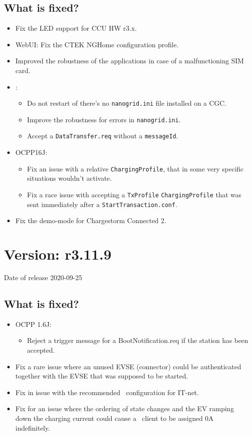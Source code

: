 \documentclass{scrartcl}
\begin{document}
\subsection*{What is fixed?}
\begin{itemize}
\item Fix the LED support for CCU HW r3.x.
\item WebUI: Fix the CTEK NGHome configuration profile.
\item Improved the robustness of the applications in case of a malfunctioning
  SIM card.
\item \nanogrid:
  \begin{itemize}
  \item Do not restart of there's no \verb|nanogrid.ini| file installed on a
    CGC.
  \item Improve the robustness for errors in \verb|nanogrid.ini|.
  \item Accept a \verb|DataTransfer.req| without a \verb|messageId|.
  \end{itemize}
\item OCPP16J:
  \begin{itemize}
  \item Fix an issue with a relative \verb|ChargingProfile|, that in some
    very specific situations wouldn't activate.
  \item Fix a race issue with accepting a \verb|TxProfile|
    \verb|ChargingProfile| that was sent immediately after a
    \verb|StartTransaction.conf|.
  \end{itemize}
\item Fix the demo-mode for Chargestorm Connected 2.
\end{itemize}

\section{Version: r3.11.9}
Date of release 2020-09-25
\subsection*{What is fixed?}
\begin{itemize}
\item OCPP 1.6J:
  \begin{itemize}
  \item Reject a trigger message for a BootNotification.req if the station has
    been accepted.
  \end{itemize}
\item Fix a rare issue where an unused EVSE (connector) could be authenticated
  together with the EVSE that was supposed to be started.
\item Fix in issue with the recommended \nanogrid\ configuration for IT-net.
\item Fix for an issue where the ordering of state changes and the EV ramping
  down the charging current could cause a \nanogrid\ client to be assigned 0A
  indefinitely.
\end{itemize}
\end{document}
